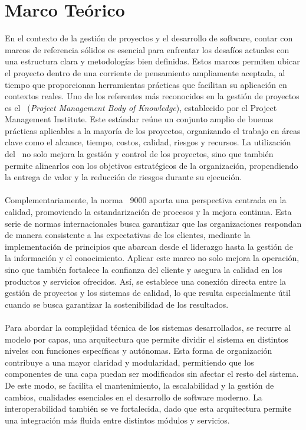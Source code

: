 \chapter*{Marco Teórico}
\label{cap:marcoTeorico}
En el contexto de la gestión de proyectos y el desarrollo de software, contar con marcos de referencia sólidos es esencial para enfrentar los desafíos actuales con una estructura clara y metodologías bien definidas. Estos marcos permiten ubicar el proyecto dentro de una corriente de pensamiento ampliamente aceptada, al tiempo que proporcionan herramientas prácticas que facilitan su aplicación en contextos reales. Uno de los referentes más reconocidos en la gestión de proyectos es el \PMBOK\ (\textit{Project Management Body of Knowledge}), establecido por el Project Management Institute. Este estándar reúne un conjunto amplio de buenas prácticas aplicables a la mayoría de los proyectos, organizando el trabajo en áreas clave como el alcance, tiempo, costos, calidad, riesgos y recursos\citep{project2017guia}. La utilización del \PMBOK\ no solo mejora la gestión y control de los proyectos, sino que también permite alinearlos con los objetivos estratégicos de la organización, propendiendo la entrega de valor y la reducción de riesgos durante su ejecución\citep{Monday2022}.\\\\
Complementariamente, la norma \ISO\ 9000 aporta una perspectiva centrada en la calidad, promoviendo la estandarización de procesos y la mejora continua\citep{ISO9001}. Esta serie de normas internacionales busca garantizar que las organizaciones respondan de manera consistente a las expectativas de los clientes, mediante la implementación de principios que abarcan desde el liderazgo hasta la gestión de la información y el conocimiento. Aplicar este marco no solo mejora la operación, sino que también fortalece la confianza del cliente y asegura la calidad en los productos y servicios ofrecidos\citep{Gray2022}. Así, se establece una conexión directa entre la gestión de proyectos y los sistemas de calidad, lo que resulta especialmente útil cuando se busca garantizar la sostenibilidad de los resultados.\\ \\
Para abordar la complejidad técnica de los sistemas desarrollados, se recurre al modelo por capas, una arquitectura que permite dividir el sistema en distintos niveles con funciones específicas y autónomas. Esta forma de organización contribuye a una mayor claridad y modularidad, permitiendo que los componentes de una capa puedan ser modificados sin afectar el resto del sistema\citep{Spray2023}. De este modo, se facilita el mantenimiento, la escalabilidad y la gestión de cambios, cualidades esenciales en el desarrollo de software moderno. La interoperabilidad también se ve fortalecida, dado que esta arquitectura permite una integración más fluida entre distintos módulos y servicios.\\ \\
